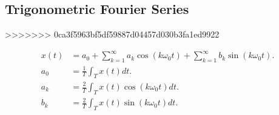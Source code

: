     \subsection*{Trigonometric Fourier Series}
>>>>>>> 0ca3f5963bf5df59887d04457d030b3fa1ed9922

    \begin{align*}
        x(t) &= a_0 + \sum_{k=1}^{\infty}a_k \cos(k\omega_0 t) + \sum_{k=1}^{\infty}b_k \sin(k\omega_0 t).\\
        a_0 &= \frac{1}{T}\int_T x(t)dt.\\
        a_k &= \frac{2}{T}\int_T x(t)\cos(k\omega_0 t)dt.\\
        b_k &= \frac{2}{T}\int_T x(t)\sin(k\omega_0 t)dt.
    \end{align*}
